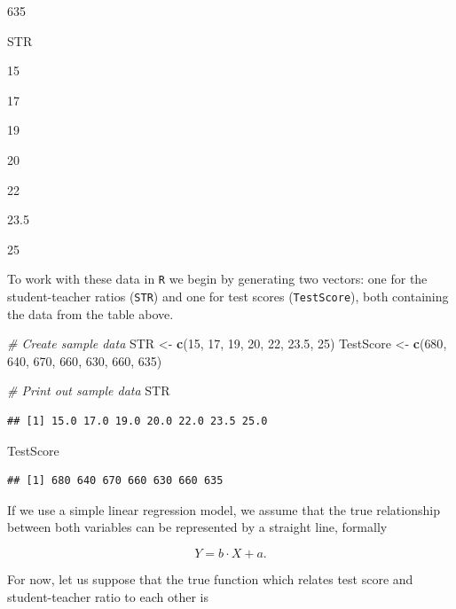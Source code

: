 \documentclass[]{book}
\newenvironment{Shaded}{\begin{snugshade}}{\end{snugshade}}
\newcommand{\KeywordTok}[1]{\textcolor[rgb]{0.13,0.29,0.53}{\textbf{#1}}}
\newcommand{\DecValTok}[1]{\textcolor[rgb]{0.00,0.00,0.81}{#1}}
\newcommand{\FloatTok}[1]{\textcolor[rgb]{0.00,0.00,0.81}{#1}}
\newcommand{\StringTok}[1]{\textcolor[rgb]{0.31,0.60,0.02}{#1}}
\newcommand{\CommentTok}[1]{\textcolor[rgb]{0.56,0.35,0.01}{\textit{#1}}}
\newcommand{\NormalTok}[1]{#1}
\theoremstyle{definition}
\theoremstyle{definition}
\theoremstyle{definition}
\theoremstyle{remark}
\begin{document}
635

STR

15

17

19

20

22

23.5

25

To work with these data in \texttt{R} we begin by generating two
vectors: one for the student-teacher ratios (\texttt{STR}) and one for
test scores (\texttt{TestScore}), both containing the data from the
table above.

\begin{Shaded}
\begin{Highlighting}[]
\CommentTok{# Create sample data}
\NormalTok{STR <-}\StringTok{ }\KeywordTok{c}\NormalTok{(}\DecValTok{15}\NormalTok{, }\DecValTok{17}\NormalTok{, }\DecValTok{19}\NormalTok{, }\DecValTok{20}\NormalTok{, }\DecValTok{22}\NormalTok{, }\FloatTok{23.5}\NormalTok{, }\DecValTok{25}\NormalTok{)}
\NormalTok{TestScore <-}\StringTok{ }\KeywordTok{c}\NormalTok{(}\DecValTok{680}\NormalTok{, }\DecValTok{640}\NormalTok{, }\DecValTok{670}\NormalTok{, }\DecValTok{660}\NormalTok{, }\DecValTok{630}\NormalTok{, }\DecValTok{660}\NormalTok{, }\DecValTok{635}\NormalTok{) }

\CommentTok{# Print out sample data}
\NormalTok{STR}
\end{Highlighting}
\end{Shaded}

\begin{verbatim}
## [1] 15.0 17.0 19.0 20.0 22.0 23.5 25.0
\end{verbatim}

\begin{Shaded}
\begin{Highlighting}[]
\NormalTok{TestScore}
\end{Highlighting}
\end{Shaded}

\begin{verbatim}
## [1] 680 640 670 660 630 660 635
\end{verbatim}

If we use a simple linear regression model, we assume that the true
relationship between both variables can be represented by a straight
line, formally

\[ Y = b \cdot X + a. \]

For now, let us suppose that the true function which relates test score
and student-teacher ratio to each other is
\end{document}
